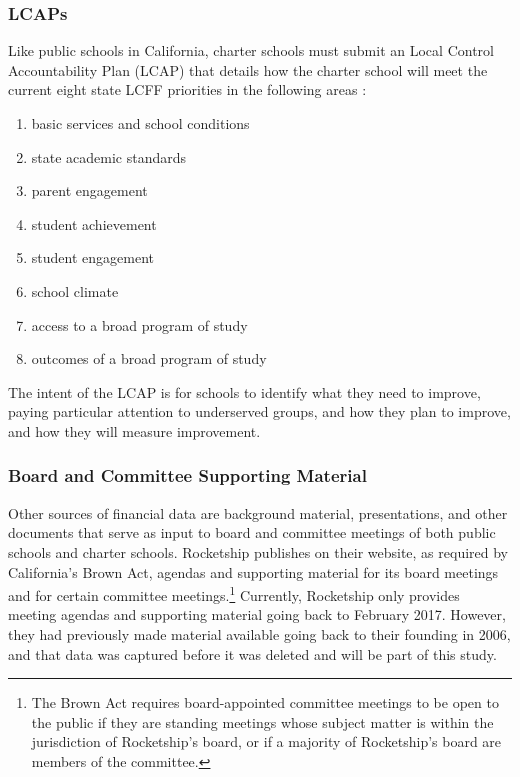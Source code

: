 \subsubsection{LCAPs}\label{sec:cs-lcaps}\indent%

Like public schools in California, charter schools must submit an Local Control Accountability Plan (LCAP) that details how the charter school will meet the current eight state LCFF priorities in the following areas \parencite[67–68]{Aguinaldo.etal2023}:
\begin{enumerate}
  \item basic services and school conditions
  \item state academic standards
  \item parent engagement
  \item student achievement
  \item student engagement
  \item school climate
  \item access to a broad program of study
  \item outcomes of a broad program of study
\end{enumerate}

The intent of the LCAP is for schools to identify what they need to improve, paying particular attention to underserved groups, and how they plan to improve, and how they will measure improvement. 

\subsubsection{Board and Committee Supporting Material}\label{sec:board-committee-packets}\indent%

Other sources of financial data are background material, presentations, and other documents that serve as input to board and committee meetings of both public schools and charter schools.  Rocketship publishes on their website, as required by California's Brown Act, agendas and supporting material for its board meetings and for certain committee meetings.\footnote{The Brown Act requires board-appointed committee meetings to be open to the public if they are standing meetings whose subject matter is within the jurisdiction of Rocketship's board, or if a majority of Rocketship's board are members of the committee.} Currently, Rocketship only provides meeting agendas and supporting material going back to February 2017. However, they had previously made material available going back to their founding in 2006, and that data was captured before it was deleted and will be part of this study.


